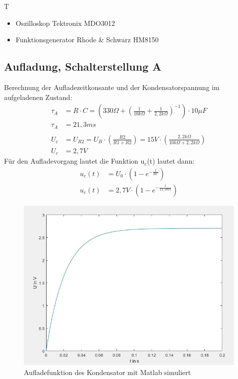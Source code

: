 \documentclass{article}
\begin{document}
\begin{devlist}
    T
    \begin{itemize}
        \item Oszilloskop Tektronix MDO3012
        \item Funktionsgenerator Rhode \& Schwarz HM8150
    \end{itemize}
\end{devlist}
\newpage

\subsection{Aufladung, Schalterstellung A}
Berechnung der Aufladezeitkonsante und der Kondensatorspannung im aufgeladenen Zustand:
\begin{align*}
    \tau_A &= R\cdot C = (330\Omega + \left(\frac{1}{10k\Omega}+\frac{1}{2,2k\Omega}\right)^{-1}) \cdot 10\mu F\\
    \tau_A &= 21,3ms\\\\
    U_c &= U_{R2} = U_B \cdot \left(\frac{R2}{R1+R2}\right) = 15V \cdot \left(\frac{2,2k\Omega}{10k\Omega+2,2k\Omega}\right)\\
    U_c &= 2,7V
\end{align*}
Für den Aufladevorgang lautet die Funktion u$_c$(t) lautet dann:
\begin{align*}
    u_c(t)&= U_0 \cdot (1 - e^{-\frac{t}{RC}})\\
    u_c(t)&= 2,7V \cdot (1 - e^{-\frac{t}{21,3ms}})
\end{align*}
\begin{figure}[h]
  \begin{center}
    \includegraphics[scale=0.6]{../assets/images/ET2P4/aufladefunktion.JPG}
    \caption{Aufladefunktion des Kondensator mit Matlab simuliert}
  \end{center}
\end{figure}
\end{document}
